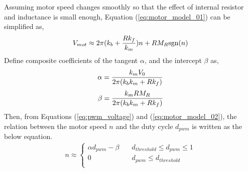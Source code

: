 Assuming motor speed changes smoothly so that the effect of internal resistor and inductance is small enough, Equation (\ref{eq:motor_model_01}) can be simplified as, \\
\begin{equation}
\label{eq:motor_model_02}
\begin{aligned}
V_{mot} \approx 2 \pi  (k_b + {{R k_f}\over{k_m}} ) n  + R M_R \text{sgn} (n)
\end{aligned}
\end{equation}
Define composite coefficients of the tangent \(\alpha\), and the intercept \(\beta\) as, 
\begin{equation}
\begin{aligned}
\alpha = {{k_m V_0} \over {2 \pi (k_b k_m + R k_f )}} 
\end{aligned}
\end{equation}
\begin{equation}
\begin{aligned}
\beta = {{k_m R M_R} \over {2 \pi (k_b k_m + R k_f )}} 
\end{aligned}
\end{equation}
Then, from Equations (\ref{eq:pwm_voltage}) and (\ref{eq:motor_model_02}), the relation between the motor speed \(n\) and the duty cycle \(d_{pwm}\) is written as the below equation.  \\
\begin{equation}
\label{eq:motor_curve_01}
\begin{aligned}
n \approx 
\begin{cases}
     \alpha d_{pwm}  - \beta \quad &  d_{threshold} \le d_{pwm} \le 1 \\
    0  \quad &   d_{pwm} \le  d_{threshold} \\
  \end{cases}
  \end{aligned}
\end{equation}

